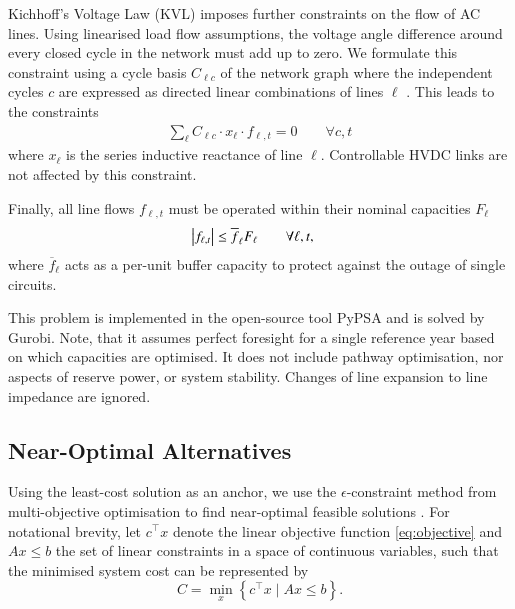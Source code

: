 Kichhoff's Voltage Law (KVL) imposes further constraints on the flow of AC lines.
Using linearised load flow assumptions, the voltage angle difference around every closed cycle in the
network must add up to zero. We formulate this constraint using a cycle basis $C_{\ell c}$
of the network graph where the independent cycles $c$ are expressed as
directed linear combinations of lines $\ell$ \cite{cycleflows}.
This leads to the constraints
\begin{align}
    \sum_\ell C_{\ell c} \cdot x_\ell \cdot f_{\ell,t} = 0 \qquad\forall c,t
    \label{eq:kvl}
\end{align}
where $x_\ell$ is the series inductive reactance of line $\ell$.
Controllable HVDC links are not affected by this constraint.

Finally, all line flows $f_{\ell,t}$ must be operated within their nominal capacities $F_\ell$
\begin{align}
    \left|f_{\ell,t}\right| \leq \overline{f}_{\ell} F_{\ell} & \qquad\forall \ell, t,
    \label{eq:lastA}
\end{align}
where $\overline{f}_\ell$ acts as a per-unit buffer capacity
to protect against the outage of single circuits.

This problem is implemented in the open-source tool PyPSA \cite{pypsa} and is solved by Gurobi.
Note, that it assumes perfect foresight for a single reference year based on which capacities are optimised.
It does not include pathway optimisation, nor aspects of reserve power, or system stability.
Changes of line expansion to line impedance are ignored.

\subsection{Near-Optimal Alternatives}
\label{sec:nearoptimal}

Using the least-cost solution as an anchor, we use the
$\epsilon$-constraint method from multi-objective optimisation
to find near-optimal feasible solutions \cite{nearoptimal,mavrotas_effective_2009}.
For notational brevity, let $c^\top x$ denote the linear objective function \cref{eq:objective}
and $Ax\leq b$ the set of linear constraints 
in a space of continuous variables, 
such that the minimised system cost can be represented by
\begin{equation}
    C = \min_x\left\{c^\top x \mid Ax\leq b\right\}.
\end{equation}


